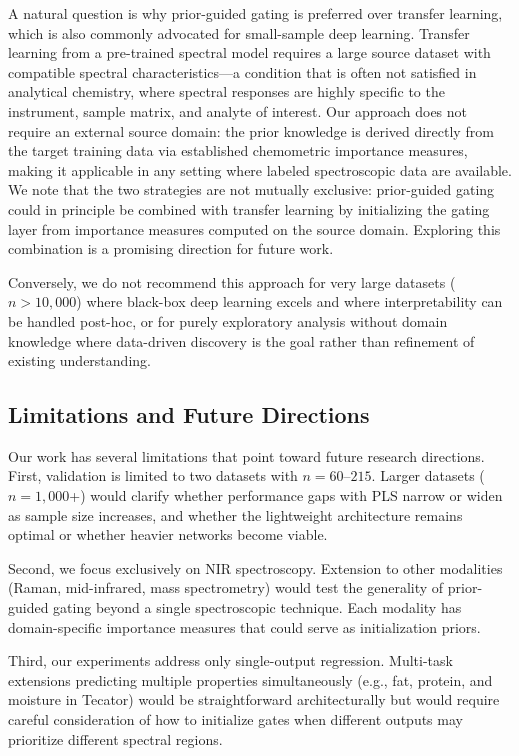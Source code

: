 \documentclass[preprint,12pt]{elsarticle}
\begin{document}
A natural question is why prior-guided gating is preferred over transfer learning, which is also commonly advocated for small-sample deep learning. Transfer learning from a pre-trained spectral model requires a large source dataset with compatible spectral characteristics---a condition that is often not satisfied in analytical chemistry, where spectral responses are highly specific to the instrument, sample matrix, and analyte of interest. Our approach does not require an external source domain: the prior knowledge is derived directly from the target training data via established chemometric importance measures, making it applicable in any setting where labeled spectroscopic data are available. We note that the two strategies are not mutually exclusive: prior-guided gating could in principle be combined with transfer learning by initializing the gating layer from importance measures computed on the source domain. Exploring this combination is a promising direction for future work.

Conversely, we do not recommend this approach for very large datasets ($n>10,000$) where black-box deep learning excels and where interpretability can be handled post-hoc, or for purely exploratory analysis without domain knowledge where data-driven discovery is the goal rather than refinement of existing understanding.

\subsection{Limitations and Future Directions}

Our work has several limitations that point toward future research directions. First, validation is limited to two datasets with $n=60$--$215$. Larger datasets ($n=1,000$+) would clarify whether performance gaps with PLS narrow or widen as sample size increases, and whether the lightweight architecture remains optimal or whether heavier networks become viable.

Second, we focus exclusively on NIR spectroscopy. Extension to other modalities (Raman, mid-infrared, mass spectrometry) would test the generality of prior-guided gating beyond a single spectroscopic technique. Each modality has domain-specific importance measures that could serve as initialization priors.

Third, our experiments address only single-output regression. Multi-task extensions predicting multiple properties simultaneously (e.g., fat, protein, and moisture in Tecator) would be straightforward architecturally but would require careful consideration of how to initialize gates when different outputs may prioritize different spectral regions.
\end{document}
